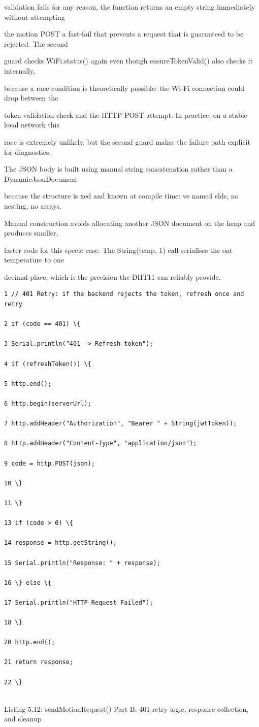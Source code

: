 validation fails for any reason, the function returns an empty string immediately without attempting

the motion POST  a fast-fail that prevents a request that is guaranteed to be rejected. The second

guard checks WiFi.status() again even though ensureTokenValid() also checks it internally,

because a race condition is theoretically possible: the Wi-Fi connection could drop between the

token validation check and the HTTP POST attempt. In practice, on a stable local network this

race is extremely unlikely, but the second guard makes the failure path explicit for diagnostics.

The JSON body is built using manual string concatenation rather than a DynamicJsonDocument

because the structure is xed and known at compile time: ve named elds, no nesting, no arrays.

Manual construction avoids allocating another JSON document on the heap and produces smaller,

faster code for this specic case. The String(temp, 1) call serialises the oat temperature to one

decimal place, which is the precision the DHT11 can reliably provide.

\begin{listingbox}
	\begin{verbatim}
1 // 401 Retry: if the backend rejects the token, refresh once and retry

2 if (code == 401) \{

3 Serial.println("401 -> Refresh token");

4 if (refreshToken()) \{

5 http.end();

6 http.begin(serverUrl);

7 http.addHeader("Authorization", "Bearer " + String(jwtToken));

8 http.addHeader("Content-Type", "application/json");

9 code = http.POST(json);

10 \}

11 \}

13 if (code > 0) \{

14 response = http.getString();

15 Serial.println("Response: " + response);

16 \} else \{

17 Serial.println("HTTP Request Failed");

18 \}

20 http.end();

21 return response;

22 \}


\end{verbatim}
\end{listingbox}
Listing 5.12: sendMotionRequest() Part B: 401 retry logic, response collection, and cleanup

